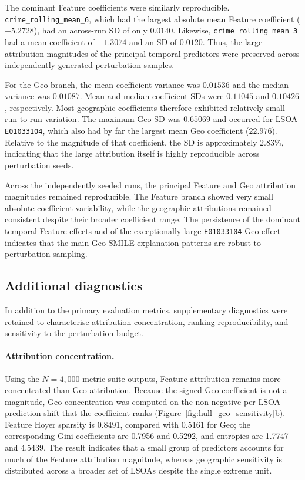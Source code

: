 The dominant Feature coefficients were similarly reproducible.
\texttt{crime\_rolling\_mean\_6}, which had the largest absolute mean Feature
coefficient ($-5.2728$), had an across-run SD of only $0.0140$.
Likewise, \texttt{crime\_rolling\_mean\_3} had a mean coefficient of
$-1.3074$ and an SD of $0.0120$. Thus, the large attribution magnitudes of
the principal temporal predictors were preserved across independently
generated perturbation samples.

For the Geo branch, the mean coefficient variance was $0.01536$ and the
median variance was $0.01087$. Mean and median coefficient SDs were
$0.11045$ and $0.10426$, respectively. Most geographic coefficients
therefore exhibited relatively small run-to-run variation. The maximum Geo
SD was $0.65069$ and occurred for LSOA \texttt{E01033104}, which also had by
far the largest mean Geo coefficient ($22.976$). Relative to the magnitude of
that coefficient, the SD is approximately $2.83\%$, indicating that the large
attribution itself is highly reproducible across perturbation seeds.

Across the independently seeded runs, the principal Feature and Geo
attribution magnitudes remained reproducible. The Feature branch showed
very small absolute coefficient variability, while the geographic
attributions remained consistent despite their broader coefficient range.
The persistence of the dominant temporal Feature effects and of the
exceptionally large \texttt{E01033104} Geo effect indicates that the main Geo-SMILE explanation patterns are robust to perturbation
sampling.


\subsection{Additional diagnostics}
\label{sec:hull_additional_metrics}

In addition to the primary evaluation metrics, supplementary diagnostics were
retained to characterise attribution concentration, ranking reproducibility,
and sensitivity to the perturbation budget.

\paragraph{Attribution concentration.}
Using the $N=4{,}000$ metric-suite outputs, Feature attribution remains more
concentrated than Geo attribution. Because the signed Geo coefficient is not a
magnitude, Geo concentration was computed on the non-negative per-LSOA
prediction shift that the coefficient ranks (Figure~\ref{fig:hull_geo_sensitivity}b).
Feature Hoyer sparsity is 0.8491, compared with 0.5161 for Geo; the
corresponding Gini coefficients are 0.7956 and 0.5292, and entropies are
1.7747 and 4.5439. The result indicates that a small group of predictors
accounts for much of the Feature attribution magnitude, whereas geographic
sensitivity is distributed across a broader set of LSOAs despite the single
extreme unit.

